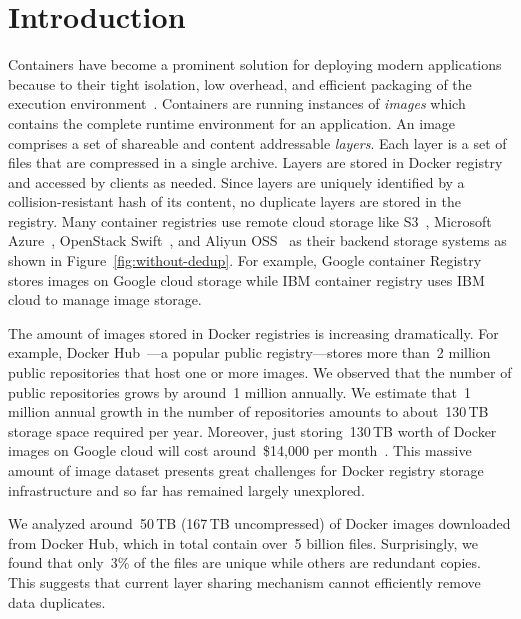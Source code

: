 \section{Introduction}
 
Containers have become a prominent solution for deploying modern applications because to their tight isolation, low overhead, and efficient packaging of the execution environment~\cite{docker}.
Containers are running instances of \emph{images} which contains the complete runtime environment for an application.
An image comprises a set of shareable and content addressable \emph{layers}.
Each layer is a set of files that are compressed in a single archive. 
Layers are stored in Docker registry and accessed by clients as needed.
Since layers are uniquely identified by a collision-resistant hash of its content, 
no duplicate layers are stored in the registry.
Many container registries use remote cloud storage like S3~\cite{s3}, 
Microsoft Azure~\cite{azure}, OpenStack Swift~\cite{swift}, and Aliyun OSS~\cite{xxx} as their backend storage systems as shown in Figure~\ref{fig:without-dedup}.
For example, Google container Registry~\cite{GoogleContainerRegistry} stores images on Google cloud storage while
IBM container registry uses IBM cloud to manage image storage.

The amount of images stored in Docker registries is increasing dramatically.
For example, Docker Hub~\cite{docker-hub}---a popular public registry---stores more than~2 million public repositories that host one or more images. 
We observed that the number of public repositories grows by around~1 million annually. 
We estimate that~1 million annual growth in the number of repositories 
amounts to about~130\,TB storage space required per year.
Moreover, 
just storing~130\,TB worth of Docker images on Google cloud will cost around~\$14,000 per month~\cite{GoogleCloudStoragePricing}.
This massive amount of image dataset presents great challenges for Docker registry storage infrastructure and so far has remained largely unexplored.

We analyzed around~50\,TB (167\,TB uncompressed) of Docker images downloaded from Docker Hub,
 which in total contain over~5 billion files.
Surprisingly, 
we found that only~3\% of the files are unique while others are redundant copies. 
This suggests that current layer sharing mechanism cannot efficiently remove data duplicates.

